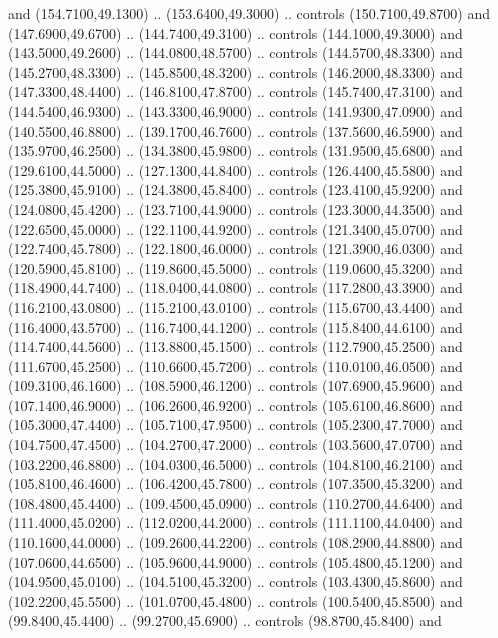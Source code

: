 {\begin{scope}[y=0.80pt, x=0.80pt, yscale=-1, xscale=1, inner sep=0pt, outer sep=0pt, #1]
      and (154.7100,49.1300) .. (153.6400,49.3000) .. controls (150.7100,49.8700)
      and (147.6900,49.6700) .. (144.7400,49.3100) .. controls (144.1000,49.3000)
      and (143.5000,49.2600) .. (144.0800,48.5700) .. controls (144.5700,48.3300)
      and (145.2700,48.3300) .. (145.8500,48.3200) .. controls (146.2000,48.3300)
      and (147.3300,48.4400) .. (146.8100,47.8700) .. controls (145.7400,47.3100)
      and (144.5400,46.9300) .. (143.3300,46.9000) .. controls (141.9300,47.0900)
      and (140.5500,46.8800) .. (139.1700,46.7600) .. controls (137.5600,46.5900)
      and (135.9700,46.2500) .. (134.3800,45.9800) .. controls (131.9500,45.6800)
      and (129.6100,44.5000) .. (127.1300,44.8400) .. controls (126.4400,45.5800)
      and (125.3800,45.9100) .. (124.3800,45.8400) .. controls (123.4100,45.9200)
      and (124.0800,45.4200) .. (123.7100,44.9000) .. controls (123.3000,44.3500)
      and (122.6500,45.0000) .. (122.1100,44.9200) .. controls (121.3400,45.0700)
      and (122.7400,45.7800) .. (122.1800,46.0000) .. controls (121.3900,46.0300)
      and (120.5900,45.8100) .. (119.8600,45.5000) .. controls (119.0600,45.3200)
      and (118.4900,44.7400) .. (118.0400,44.0800) .. controls (117.2800,43.3900)
      and (116.2100,43.0800) .. (115.2100,43.0100) .. controls (115.6700,43.4400)
      and (116.4000,43.5700) .. (116.7400,44.1200) .. controls (115.8400,44.6100)
      and (114.7400,44.5600) .. (113.8800,45.1500) .. controls (112.7900,45.2500)
      and (111.6700,45.2500) .. (110.6600,45.7200) .. controls (110.0100,46.0500)
      and (109.3100,46.1600) .. (108.5900,46.1200) .. controls (107.6900,45.9600)
      and (107.1400,46.9000) .. (106.2600,46.9200) .. controls (105.6100,46.8600)
      and (105.3000,47.4400) .. (105.7100,47.9500) .. controls (105.2300,47.7000)
      and (104.7500,47.4500) .. (104.2700,47.2000) .. controls (103.5600,47.0700)
      and (103.2200,46.8800) .. (104.0300,46.5000) .. controls (104.8100,46.2100)
      and (105.8100,46.4600) .. (106.4200,45.7800) .. controls (107.3500,45.3200)
      and (108.4800,45.4400) .. (109.4500,45.0900) .. controls (110.2700,44.6400)
      and (111.4000,45.0200) .. (112.0200,44.2000) .. controls (111.1100,44.0400)
      and (110.1600,44.0000) .. (109.2600,44.2200) .. controls (108.2900,44.8800)
      and (107.0600,44.6500) .. (105.9600,44.9000) .. controls (105.4800,45.1200)
      and (104.9500,45.0100) .. (104.5100,45.3200) .. controls (103.4300,45.8600)
      and (102.2200,45.5500) .. (101.0700,45.4800) .. controls (100.5400,45.8500)
      and (99.8400,45.4400) .. (99.2700,45.6900) .. controls (98.8700,45.8400) and

\end{scope}}
